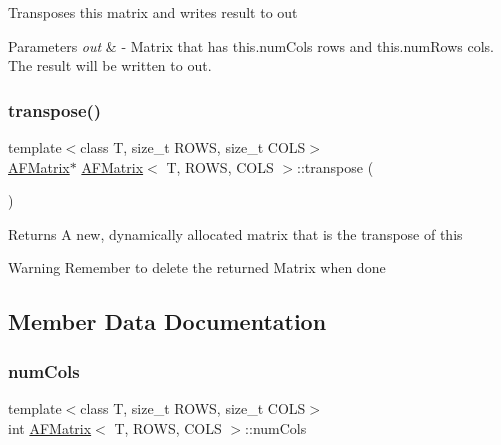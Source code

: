 Transposes this matrix and writes result to out 
\begin{DoxyParams}{Parameters}
{\em out} & -\/ Matrix that has this.\+num\+Cols rows and this.\+num\+Rows cols. The result will be written to out. \\
\hline
\end{DoxyParams}
\mbox{\label{class_a_f_matrix_a5f20b3ee2b16cbb9b9b39215a81d3aa1}} 
\subsubsection{\texorpdfstring{transpose()}{transpose()}\hspace{0.1cm}{\footnotesize\ttfamily [2/2]}}
{\footnotesize\ttfamily template$<$class T, size\+\_\+t R\+O\+WS, size\+\_\+t C\+O\+LS$>$ \\
\hyperlink{class_a_f_matrix}{A\+F\+Matrix}$\ast$ \hyperlink{class_a_f_matrix}{A\+F\+Matrix}$<$ T, R\+O\+WS, C\+O\+LS $>$\+::transpose (\begin{DoxyParamCaption}{ }\end{DoxyParamCaption})\hspace{0.3cm}{\ttfamily [inline]}}

\begin{DoxyReturn}{Returns}
A new, dynamically allocated matrix that is the transpose of this 
\end{DoxyReturn}
\begin{DoxyWarning}{Warning}
Remember to delete the returned Matrix when done 
\end{DoxyWarning}


\subsection{Member Data Documentation}
\mbox{\label{class_a_f_matrix_aed28746540fcca94d5d1448b098b4ecc}} 
\subsubsection{\texorpdfstring{num\+Cols}{numCols}}
{\footnotesize\ttfamily template$<$class T, size\+\_\+t R\+O\+WS, size\+\_\+t C\+O\+LS$>$ \\
int \hyperlink{class_a_f_matrix}{A\+F\+Matrix}$<$ T, R\+O\+WS, C\+O\+LS $>$\+::num\+Cols}

